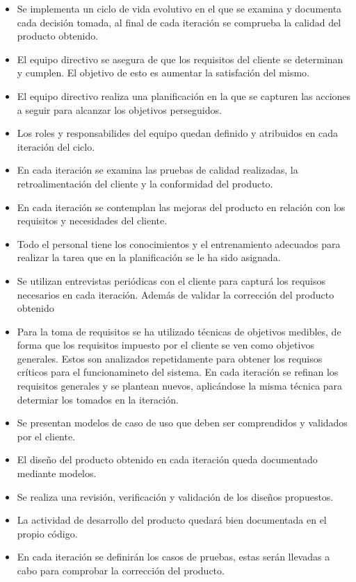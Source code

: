 \begin{itemize}
\item Se implementa un ciclo de vida evolutivo en el que se examina y documenta cada decisión tomada, al final de cada iteración se comprueba la calidad del producto obtenido.
\item El equipo directivo se asegura de que los requisitos del cliente se determinan y cumplen. El objetivo de esto es aumentar la satisfación del mismo.
\item El equipo directivo realiza una planificación en la que se capturen las acciones a seguir para alcanzar los objetivos perseguidos.
\item Los roles y responsabilides del equipo quedan definido y atribuidos en cada iteración del ciclo.
\item En cada iteración se examina las pruebas de calidad realizadas, la retroalimentación del cliente y la conformidad del producto.  
\item En cada iteración se contemplan las mejoras del producto en relación con los requisitos y necesidades del cliente.
\item Todo el personal tiene los conocimientos y el entrenamiento adecuados para realizar la tarea que en la planificación se le ha sido asignada.
\item Se utilizan entrevistas periódicas con el cliente para capturá los requisos necesarios en cada iteración. Además de validar la corrección del producto obtenido
\item Para la toma de requisitos se ha utilizado técnicas de objetivos medibles, de forma que los requisitos impuesto por el cliente se ven como objetivos generales. 
Estos son analizados repetidamente para obtener los requisos críticos para el funcionamineto del sistema. En cada iteración se refinan los requisitos generales y se plantean 
nuevos, aplicándose la misma técnica para determiar los tomados en la iteración. 
\item Se presentan modelos de caso de uso que deben ser comprendidos y validados por el cliente. 
\item El diseño del producto obtenido en cada iteración queda documentado mediante modelos.
\item Se realiza una revisión, verificación y validación de los diseños propuestos.
\item La actividad de desarrollo del producto quedará bien documentada en el propio código. 
\item En cada iteración se definirán los casos de pruebas, estas serán llevadas a cabo para comprobar la corrección del producto.
\end{itemize}

